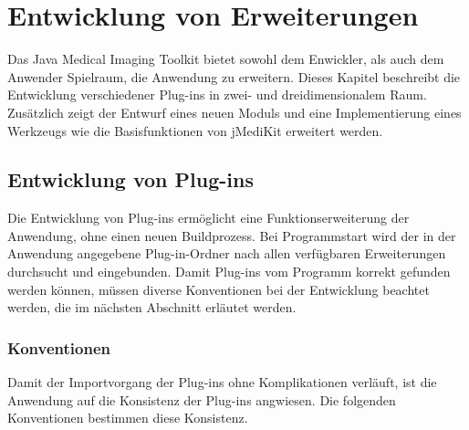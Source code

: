\chapter{Entwicklung von Erweiterungen} \label{extending}

Das Java Medical Imaging Toolkit bietet sowohl dem Enwickler, als auch dem Anwender Spielraum, die Anwendung zu erweitern. Dieses Kapitel beschreibt die Entwicklung verschiedener Plug-ins in zwei- und dreidimensionalem Raum. Zusätzlich zeigt der Entwurf eines neuen Moduls und eine Implementierung eines Werkzeugs wie die Basisfunktionen von jMediKit erweitert werden.

\FloatBarrier
\section{Entwicklung von Plug-ins}

Die Entwicklung von Plug-ins ermöglicht eine Funktionserweiterung der Anwendung, ohne einen neuen Buildprozess. Bei Programmstart wird der in der Anwendung angegebene Plug-in-Ordner nach allen verfügbaren Erweiterungen durchsucht und eingebunden. Damit Plug-ins vom Programm korrekt gefunden werden können, müssen diverse Konventionen bei der Entwicklung beachtet werden, die im nächsten Abschnitt erläutet werden.

\FloatBarrier
\subsection{Konventionen}
Damit der Importvorgang der Plug-ins ohne Komplikationen verläuft, ist die Anwendung auf die Konsistenz der Plug-ins angwiesen. Die folgenden Konventionen bestimmen diese Konsistenz.

